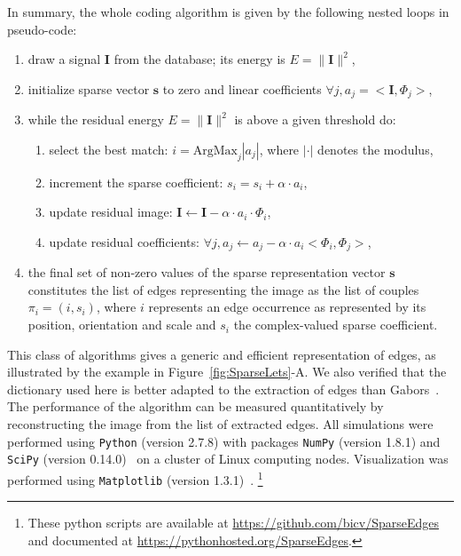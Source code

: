 \documentclass[a4paper, 11pt]{book}
\begin{document}
In summary, the whole coding algorithm is given by the following nested loops
in pseudo-code:
\begin{enumerate}
\item draw a signal $\mathbf{I}$ from the database; its energy is $E = \| \mathbf{I} \|^2$,
\item initialize sparse vector $\mathbf{s}$ to zero and linear coefficients $\forall j, {a}_j=<\mathbf{I}, \Phi_j >$,
\item while the residual energy $E = \| \mathbf{I} \|^2$ is above a given threshold do:
\begin{enumerate}
\item select the best match: $i = \mbox{ArgMax}_{j} | {a}_j |$, where $| \cdot |$ denotes the modulus,
\item increment the sparse coefficient: $s_{i} = s_{i} + \alpha \cdot {a}_{i}$,
\item update residual image: $ \mathbf{I} \leftarrow \mathbf{I} - \alpha \cdot a_{i} \cdot \Phi_{i} $,
\item update residual coefficients: $\forall j, {a}_j \leftarrow {a}_j - \alpha \cdot a_{i} <\Phi_{i} , \Phi_j > $,
\end{enumerate}
\item the final set of non-zero values of the sparse representation vector
$\mathbf{s}$ constitutes the list of edges representing the
image as the list of couples $\pi_i = (i, s_{i})$, where $i$ represents an edge occurrence
as represented by its position, orientation and scale and $s_i$ the complex-valued sparse coefficient.
\end{enumerate}
This class of algorithms gives a generic and efficient representation of edges,
as illustrated by the example in Figure~\ref{fig:SparseLets}-A.
We also verified that the dictionary used here is better adapted
to the extraction of edges than Gabors~\citep{Fischer07}.
The performance of the algorithm can be measured quantitatively
by reconstructing the image from the list of extracted edges.
All simulations were performed using \verb+Python+ (version 2.7.8)
with packages \verb+NumPy+ (version 1.8.1) and \verb+SciPy+ (version 0.14.0)~\citep{Oliphant07}
on a cluster of Linux computing nodes.
Visualization was performed using \verb+Matplotlib+ (version 1.3.1)~\citep{Hunter07}.
\footnote{These python scripts are available at \url{https://github.com/bicv/SparseEdges} and documented at \url{https://pythonhosted.org/SparseEdges}.}
\end{document}
